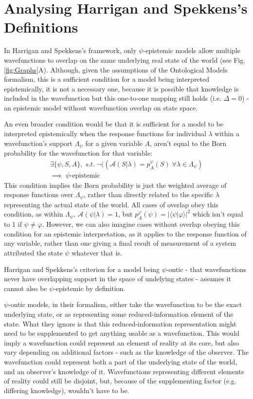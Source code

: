 \documentclass[superscriptaddress,reprint, floatfix, prl,nofootinbib]{revtex4-2}
\newcommand{\braket}[2]{\langle #1|#2 \rangle}
\begin{document}
\section{Analysing Harrigan and Spekkens's Definitions}

In Harrigan and Spekkens's framework, only $\psi$-epistemic models allow multiple wavefunctions to overlap on the same underlying real state of the world (see Fig. \ref{fig:Graphs}A). Although, given the assumptions of the Ontological Models formalism, this is a sufficient condition for a model being interpreted epistemically, it is not a necessary one, because it is possible that knowledge is included in the wavefunction but this one-to-one mapping still holds (i.e. $\Delta=0$) - an epistemic model without wavefunction overlap on state space.

An even broader condition would be that it is sufficient for a model to be interpreted epistemically when the response functions for individual $\lambda$ within a wavefunction's support $\Lambda_\psi$ for a given variable $A$, aren't equal to the Born probability for the wavefunction for that variable:
\begin{equation}
\begin{split}
  \exists\{\psi,S,A\},\;s.t.\;\neg((\mathcal{A}(S\vert\lambda)=p^\psi_A(S)\;\forall\lambda\in\Lambda_{\psi})\\
  \implies\;\psi\text{-epistemic}
  \end{split}
\end{equation}
This condition implies the Born probability is just the weighted average of response functions over $\Lambda_\psi$, rather than directly related to the specific $\lambda$ representing the actual state of the world. All cases of overlap obey this condition, as within $\Lambda_\psi$, $\mathcal{A}(\psi\vert\lambda)=1$, but $p^\varphi_A(\psi)=\vert\braket{\psi}{\varphi}\vert^2$ which isn't equal to 1 if $\psi\neq\varphi$. However, we can also imagine cases without overlap obeying this condition for an epistemic interpretation, as it applies to the response function of any variable, rather than one giving a final result of measurement of a system attributed the state $\psi$ whatever that is.

Harrigan and Spekkens's criterion for a model being $\psi$-ontic - that wavefunctions never have overlapping support in the space of undelying states - assumes it cannot also be $\psi$-epistemic by definition.

$\psi$-ontic models, in their formalism, either take the wavefunction to be the exact underlying state, or as representing some reduced-information element of the state. What they ignore is that this reduced-information representation might need to be supplemented to get anything usable as a wavefunction. This would imply a wavefunction could represent an element of reality at its core, but also vary depending on additional factors - such as the knowledge of the observer. The wavefunction could represent both a part of the underlying state of the world, and an observer's knowledge of it. Wavefunctions representing different elements of reality could still be disjoint, but, because of the supplementing factor (e.g. differing knowledge), wouldn't have to be.
\end{document}
